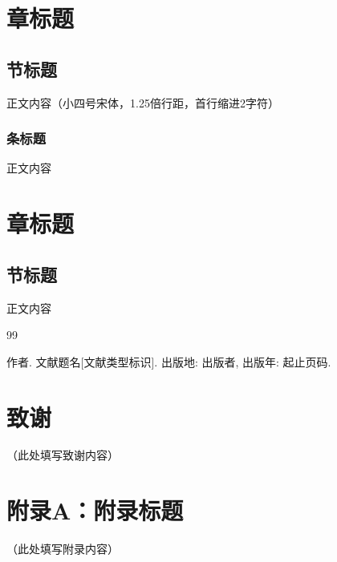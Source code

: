 \documentclass[a4paper,12pt]{article}
\begin{document}
\newpage
\tableofcontents

\newpage
{}

\section{章标题}

\subsection{节标题}

正文内容（小四号宋体，1.25倍行距，首行缩进2字符）

\subsubsection{条标题}

正文内容

\section{章标题}

\subsection{节标题}

正文内容

\newpage
\begin{thebibliography}{99}

作者. 文献题名[文献类型标识]. 出版地: 出版者, 出版年: 起止页码.

\end{thebibliography}

\newpage
\section*{致\quad 谢}

（此处填写致谢内容）

\newpage
\section*{附录A：附录标题}

（此处填写附录内容）
\end{document}
